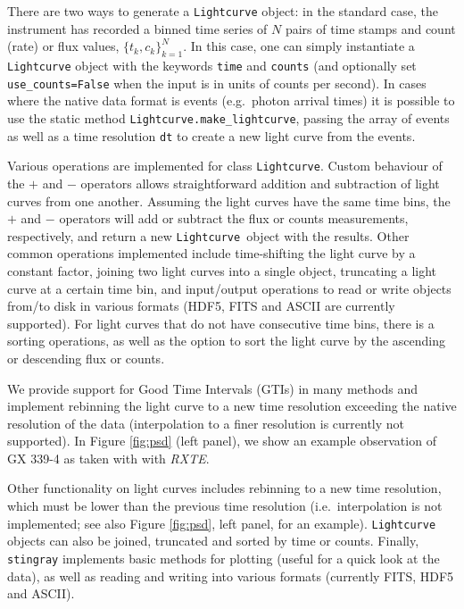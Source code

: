 \documentclass[twocolumn]{aastex62}
\newcommand{\project}[1]{\textsl{#1}\xspace}
\newcommand{\rxte}{\project{RXTE}\xspace}
\newcommand{\stingray}{\texttt{stingray}\xspace}
\newcommand{\lightcurve}{\texttt{Lightcurve}\xspace}
\begin{document}
There are two ways to generate a \texttt{Lightcurve} object: in the standard case, the instrument has recorded a binned time series of $N$ pairs of time stamps and count (rate) or flux values, $\{t_k, c_k \}_{k=1}^{N}$. In this case, one can simply instantiate a \texttt{Lightcurve} object with the keywords \texttt{time} and \texttt{counts} (and optionally set \texttt{use\_counts=False} when the input is in units of counts per second). In cases where the native data format is events (e.g.\ photon arrival times) it is possible to use the static method \texttt{Lightcurve.make\_lightcurve}, passing the array of events as well as a time resolution \texttt{dt} to create a new light curve from the events.

Various operations are implemented for class \lightcurve. Custom behaviour of the $+$ and $-$ operators allows straightforward addition and subtraction of light curves from one another. Assuming the light curves have the same time bins, the $+$ and $-$ operators will add or subtract the flux or counts measurements, respectively, and return a new \lightcurve\ object with the results. Other common operations implemented include time-shifting the light curve by a constant factor, joining two light curves into a single object, truncating a light curve at a certain time bin, and input/output operations to read or write objects from/to disk in various formats (HDF5, FITS and ASCII are currently supported). For light curves that do not have consecutive time bins, there is a sorting operations, as well as the option to sort the light curve by the ascending or descending flux or counts. 

We provide support for Good Time Intervals (GTIs) in many methods and implement rebinning the light curve to a new time resolution exceeding the native resolution of the data (interpolation to a finer resolution is currently not supported). In Figure \ref{fig:psd} (left panel), we show an example observation of GX 339-4 as taken with with \rxte.

Other functionality on light curves includes rebinning to a new time resolution, which must be lower than the previous time resolution (i.e.\ interpolation is not implemented; see also Figure \ref{fig:psd}, left panel, for an example). 
\lightcurve objects can also be joined, truncated and sorted by time or counts. Finally, \stingray implements basic methods for plotting (useful for a quick look at the data), as well as reading and writing into various formats (currently FITS, HDF5 and ASCII).
\end{document}

